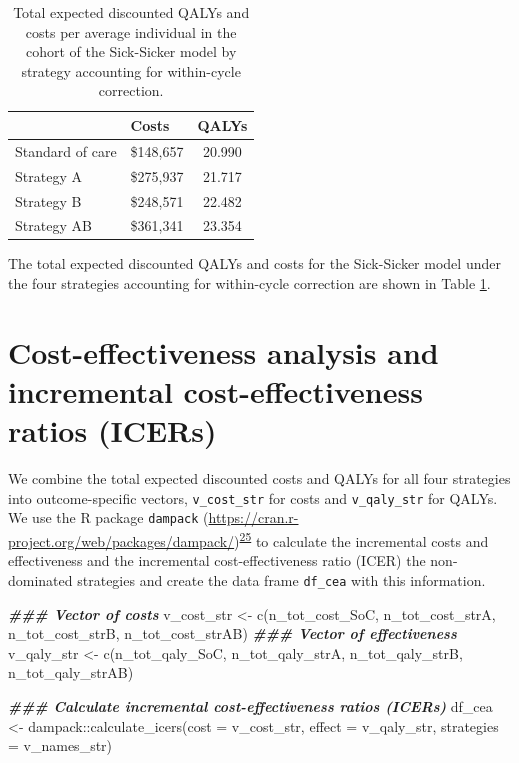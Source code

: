 \documentclass[
]{article}
\newenvironment{Shaded}{\begin{snugshade}}{\end{snugshade}}
\newcommand{\AttributeTok}[1]{\textcolor[rgb]{0.77,0.63,0.00}{#1}}
\newcommand{\DocumentationTok}[1]{\textcolor[rgb]{0.56,0.35,0.01}{\textbf{\textit{#1}}}}
\newcommand{\FunctionTok}[1]{\textcolor[rgb]{0.00,0.00,0.00}{#1}}
\newcommand{\NormalTok}[1]{#1}
\newcommand{\OtherTok}[1]{\textcolor[rgb]{0.56,0.35,0.01}{#1}}
\newcommand{\SpecialCharTok}[1]{\textcolor[rgb]{0.00,0.00,0.00}{#1}}
\begin{document}
\begin{table}[!h]

\caption{\label{tab:Expected-outcomes-table}Total expected discounted QALYs and costs per average individual in the cohort of the Sick-Sicker model by strategy accounting for within-cycle correction.}
\centering
\begin{tabular}[t]{llc}
\toprule
  & Costs & QALYs\\
\midrule
Standard of care & \$148,657 & 20.990\\
Strategy A & \$275,937 & 21.717\\
Strategy B & \$248,571 & 22.482\\
Strategy AB & \$361,341 & 23.354\\
\bottomrule
\end{tabular}
\end{table}

The total expected discounted QALYs and costs for the Sick-Sicker model under the four strategies accounting for within-cycle correction are shown in Table \ref{tab:Expected-outcomes-table}.

\hypertarget{cost-effectiveness-analysis-and-incremental-cost-effectiveness-ratios-icers}{%
\section{Cost-effectiveness analysis and incremental cost-effectiveness ratios (ICERs)}\label{cost-effectiveness-analysis-and-incremental-cost-effectiveness-ratios-icers}}

We combine the total expected discounted costs and QALYs for all four strategies into outcome-specific vectors, \texttt{v\_cost\_str} for costs and \texttt{v\_qaly\_str} for QALYs. We use the R package \texttt{dampack} (\url{https://cran.r-project.org/web/packages/dampack/})\textsuperscript{\protect\hyperlink{ref-Alarid-Escudero2021}{25}} to calculate the incremental costs and effectiveness and the incremental cost-effectiveness ratio (ICER) the non-dominated strategies and create the data frame \texttt{df\_cea} with this information.

\begin{Shaded}
\begin{Highlighting}[]
\DocumentationTok{\#\#\# Vector of costs}
\NormalTok{v\_cost\_str }\OtherTok{\textless{}{-}} \FunctionTok{c}\NormalTok{(n\_tot\_cost\_SoC, n\_tot\_cost\_strA, n\_tot\_cost\_strB, n\_tot\_cost\_strAB)}
\DocumentationTok{\#\#\# Vector of effectiveness}
\NormalTok{v\_qaly\_str }\OtherTok{\textless{}{-}} \FunctionTok{c}\NormalTok{(n\_tot\_qaly\_SoC, n\_tot\_qaly\_strA, n\_tot\_qaly\_strB, n\_tot\_qaly\_strAB)}

\DocumentationTok{\#\#\# Calculate incremental cost{-}effectiveness ratios (ICERs)}
\NormalTok{df\_cea }\OtherTok{\textless{}{-}}\NormalTok{ dampack}\SpecialCharTok{::}\FunctionTok{calculate\_icers}\NormalTok{(}\AttributeTok{cost =}\NormalTok{ v\_cost\_str, }
                                   \AttributeTok{effect =}\NormalTok{ v\_qaly\_str,}
                                   \AttributeTok{strategies =}\NormalTok{ v\_names\_str)}
\end{Highlighting}
\end{Shaded}
\end{document}
